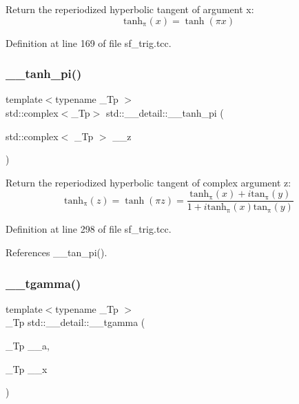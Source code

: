 Return the reperiodized hyperbolic tangent of argument x\+: \[ \mathrm{tanh_\pi}(x) = \tanh(\pi x) \] 

Definition at line 169 of file sf\+\_\+trig.\+tcc.

\mbox{\label{namespacestd_1_1____detail_a75775747d40813d5d54c0b7a7d0c39f0}} 
\subsubsection{\texorpdfstring{\+\_\+\+\_\+tanh\+\_\+pi()}{\_\_tanh\_pi()}\hspace{0.1cm}{\footnotesize\ttfamily [2/2]}}
{\footnotesize\ttfamily template$<$typename \+\_\+\+Tp $>$ \\
std\+::complex$<$\+\_\+\+Tp$>$ std\+::\+\_\+\+\_\+detail\+::\+\_\+\+\_\+tanh\+\_\+pi (\begin{DoxyParamCaption}\item[{std\+::complex$<$ \+\_\+\+Tp $>$}]{\+\_\+\+\_\+z }\end{DoxyParamCaption})}

Return the reperiodized hyperbolic tangent of complex argument z\+: \[ \mathrm{tanh_\pi}(z) = \tanh(\pi z) = \frac{\mathrm{tanh_\pi}(x) + i \mathrm{tan_\pi}(y)} {1 + i \mathrm{tanh_\pi}(x) \mathrm{tan_\pi}(y)} \] 

Definition at line 298 of file sf\+\_\+trig.\+tcc.



References \+\_\+\+\_\+tan\+\_\+pi().

\mbox{\label{namespacestd_1_1____detail_ad2f6546e22348b07d992d522153d7d6b}} 
\subsubsection{\texorpdfstring{\+\_\+\+\_\+tgamma()}{\_\_tgamma()}}
{\footnotesize\ttfamily template$<$typename \+\_\+\+Tp $>$ \\
\+\_\+\+Tp std\+::\+\_\+\+\_\+detail\+::\+\_\+\+\_\+tgamma (\begin{DoxyParamCaption}\item[{\+\_\+\+Tp}]{\+\_\+\+\_\+a,  }\item[{\+\_\+\+Tp}]{\+\_\+\+\_\+x }\end{DoxyParamCaption})}



